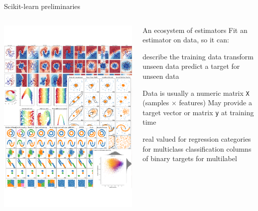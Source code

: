 \documentclass[aspectratio=169, 22pt]{beamer}
\begin{document}
\begin{plain}{Scikit-learn preliminaries}
	\begin{columns}[t]\begin{column}{.39\textwidth}
		\vspace*{-3.5em}
		\hspace*{1em}\includegraphics[width=\columnwidth]{fig/collection-of-estimators}
	\end{column}\begin{column}{.6\textwidth}
		\vspace*{-1.5em}
	\begin{itemize}
	\p An ecosystem of estimators
	\p Fit an estimator on data, so it can:
	\begin{itemize}
		\p describe the training data
		\p transform unseen data
		\p predict a target for unseen data
	\end{itemize}
	\p Data is usually a numeric matrix \verb|X|\\ (samples $\times$ features)
	\p May provide a target vector or matrix \verb|y| at training time
	\begin{itemize}
		\p real valued for regression
		\p categories for multiclass classification
		\p columns of binary targets for multilabel
	\end{itemize}
	\end{itemize}
	\end{column}\end{columns}
\end{plain}
\end{document}
